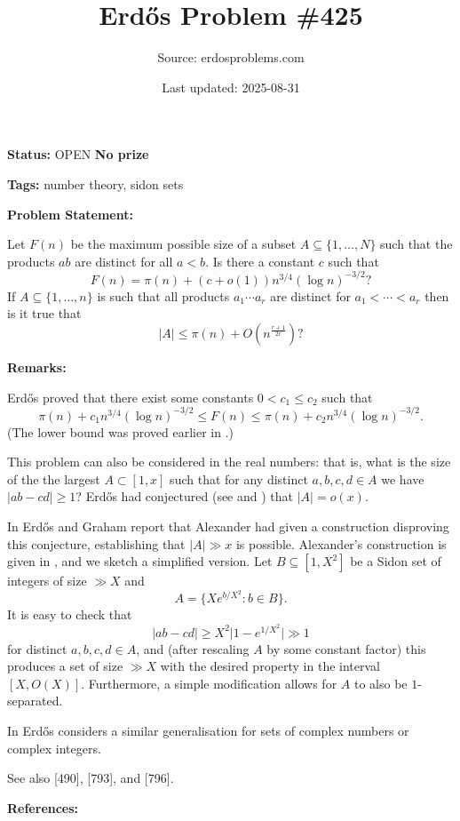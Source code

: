 \documentclass{article}
\title{Erd\H{o}s Problem \#425}
\date{Last updated: 2025-08-31}
\author{Source: erdosproblems.com}
\begin{document}
\maketitle

\noindent\textbf{Status:} OPEN \quad \textbf{No prize}

\noindent\textbf{Tags:} number theory, sidon sets

\medskip
\noindent\textbf{Problem Statement:}

Let $F(n)$ be the maximum possible size of a subset $A\subseteq\{1,\ldots,N\}$ such that the products $ab$ are distinct for all $a<b$. Is there a constant $c$ such that\[F(n)=\pi(n)+(c+o(1))n^{3/4}(\log n)^{-3/2}?\]If $A\subseteq \{1,\ldots,n\}$ is such that all products $a_1\cdots a_r$ are distinct for $a_1<\cdots <a_r$ then is it true that\[\lvert A\rvert \leq \pi(n)+O(n^{\frac{r+1}{2r}})?\]

\bigskip
\noindent\textbf{Remarks:}

Erd\H{o}s \cite{Er68} proved that there exist some constants $0<c_1\leq c_2$ such that\[\pi(n)+c_1 n^{3/4}(\log n)^{-3/2}\leq F(n)\leq \pi(n)+c_2 n^{3/4}(\log n)^{-3/2}.\](The lower bound was proved earlier in \cite{Er38}.)

This problem can also be considered in the real numbers: that is, what is the size of the the largest $A\subset [1,x]$ such that for any distinct $a,b,c,d\in A$ we have $\lvert ab-cd\rvert \geq 1$? Erd\H{o}s had conjectured (see \cite{Er73} and \cite{Er77c}) that $\lvert A\rvert=o(x)$.

In \cite{ErGr80} Erd\H{o}s and Graham report that Alexander had given a construction disproving this conjecture, establishing that $\lvert A\rvert\gg x$ is possible. Alexander's construction is given in \cite{Er80}, and we sketch a simplified version. Let $B\subseteq [1,X^2]$ be a Sidon set of integers of size $\gg X$ and\[A=\{ X e^{b/X^2} : b\in B\}.\]It is easy to check that\[\lvert ab-cd\rvert \geq X^2\lvert 1-e^{1/X^2}\rvert \gg 1\]for distinct $a,b,c,d\in A$, and (after rescaling $A$ by some constant factor) this produces a set of size $\gg X$ with the desired property in the interval $[X,O(X)]$. Furthermore, a simple modification allows for $A$ to also be $1$-separated.

In \cite{Er77c} Erd\H{o}s considers a similar generalisation for sets of complex numbers or complex integers.

See also [490], [793], and [796].

\bigskip
\noindent\textbf{References:}
\end{document}
